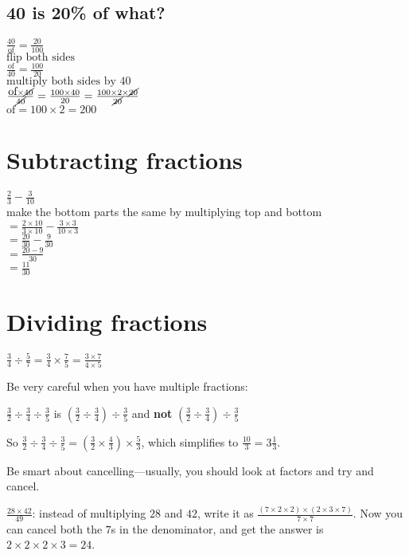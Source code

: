 \documentclass[fullpage,twocolumn]{article}
\begin{document}
\subsection{40 is 20\% of what?}

${\frac{40}{\mbox{of}} = \frac{20}{100}}$  \\
${\mbox{flip both sides} }$ \\
${\frac{\mbox{of}}{40} = \frac{100}{20}}$  \\
${\mbox{multiply both sides by 40}} $ \\
${\frac{\mbox{of} \times \cancel{40}}{\cancel{40}} = \frac{100 \times 40}{20} = \frac{100 \times 2 \times \cancel{20}}{\cancel{20}}} $ \\
${\mbox{of} = 100 \times 2 = 200} $


\section{Subtracting fractions}
${\frac{2}{3} - \frac{3}{10}}$ \\
make the bottom parts the same by multiplying top and bottom \\
${= \frac{2 \times 10}{ 3 \times 10} - \frac{3 \times 3}{10 \times 3}}$ \\
${ = \frac{20}{30} - \frac{9}{30}}$ \\
${ = \frac{20 - 9 }{30 }} $\\
${ = \frac{11}{30}}$

\section{Dividing fractions}

$\frac{3}{4} \div \frac{5}{7} = \frac{3}{4} \times \frac{7}{5} = \frac{3 \times 7 }{4 \times 5}$

Be very careful when you have multiple fractions:

$\frac{3}{2} \div \frac{3}{4} \div \frac{3}{5}$ is $(\frac{3}{2} \div \frac{3}{4})\div \frac{3}{5}$
and {\bf not} $(\frac{3}{2} \div \frac{3}{4})\div \frac{3}{5}$

So $\frac{3}{2} \div \frac{3}{4} \div \frac{3}{5} = (\frac{3}{2} \times \frac{4}{3}) \times \frac{5}{3}$, which simplifies to $\frac{10}{3} = 3 \frac{1}{3}$.

Be smart about cancelling---usually, you should look at factors and try and cancel.

$\frac{28 \times 42}{49}$: instead of multiplying $28$ and $42$, write it as
$\frac{(7 \times 2 \times 2)\times (2 \times 3 \times 7)}{7 \times 7}$. Now you can cancel
both the $7$s in the denominator, and get the answer is $2 \times 2 \times 2 \times 3 = 24$.
\end{document}

